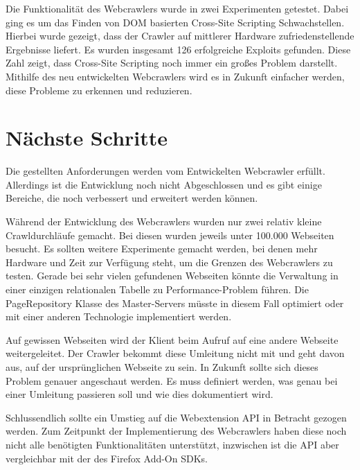 Die Funktionalität des Webcrawlers wurde in zwei Experimenten getestet. Dabei ging es um das Finden von DOM basierten Cross-Site Scripting Schwachstellen. Hierbei wurde gezeigt, dass der Crawler auf mittlerer Hardware zufriedenstellende Ergebnisse liefert. Es wurden insgesamt 126 erfolgreiche Exploits gefunden. Diese Zahl zeigt, dass Cross-Site Scripting noch immer ein großes Problem darstellt. Mithilfe des neu entwickelten Webcrawlers wird es in Zukunft einfacher werden, diese Probleme zu erkennen und reduzieren.

\section{Nächste Schritte}
Die gestellten Anforderungen werden vom Entwickelten Webcrawler erfüllt. Allerdings ist die Entwicklung noch nicht Abgeschlossen und es gibt einige Bereiche, die noch verbessert und erweitert werden können. 

Während der Entwicklung des Webcrawlers wurden nur zwei relativ kleine Crawldurchläufe gemacht. Bei diesen wurden jeweils unter 100.000 Webseiten besucht. Es sollten weitere Experimente gemacht werden, bei denen mehr Hardware und Zeit zur Verfügung steht, um die Grenzen des Webcrawlers zu testen. Gerade bei sehr vielen gefundenen Webseiten könnte die Verwaltung in einer einzigen relationalen Tabelle zu Performance-Problem führen. Die PageRepository Klasse des Master-Servers müsste in diesem Fall optimiert oder mit einer anderen Technologie implementiert werden. 

Auf gewissen Webseiten wird der Klient beim Aufruf auf eine andere Webseite weitergeleitet. Der Crawler bekommt diese Umleitung nicht mit und geht davon aus, auf der ursprünglichen Webseite zu sein. In Zukunft sollte sich dieses Problem genauer angeschaut werden. Es muss definiert werden, was genau bei einer Umleitung passieren soll und wie dies dokumentiert wird.

Schlussendlich sollte ein Umstieg auf die Webextension API in Betracht gezogen werden. Zum Zeitpunkt der Implementierung des Webcrawlers haben diese noch nicht alle benötigten Funktionalitäten unterstützt, inzwischen ist die API aber vergleichbar mit der des Firefox Add-On SDKs.




